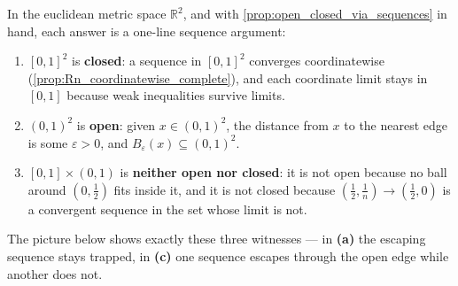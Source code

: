 \begin{example}
\label{ex:open_closed_neither_R2}
In the euclidean metric space $\mathbb{R}^2$, and with
\cref{prop:open_closed_via_sequences} in hand, each answer is a one-line sequence argument:
\begin{enumerate}[label=\textbf{(\alph*)}]
  \item $[0,1]^2$ is \textbf{closed}: a sequence in $[0,1]^2$ converges coordinatewise
    (\cref{prop:Rn_coordinatewise_complete}), and each coordinate limit stays in $[0,1]$ because
    weak inequalities survive limits.
  \item $(0,1)^2$ is \textbf{open}: given $x \in (0,1)^2$, the distance from $x$ to the nearest
    edge is some $\varepsilon>0$, and $B_\varepsilon(x) \subseteq (0,1)^2$.
  \item $[0,1] \times (0,1)$ is \textbf{neither open nor closed}: it is not open because no ball
    around $(0,\tfrac12)$ fits inside it, and it is not closed because
    $(\tfrac12, \tfrac1n) \to (\tfrac12, 0)$ is a convergent sequence in the set whose limit is
    not.
\end{enumerate}
The picture below shows exactly these three witnesses --- in \textbf{(a)} the escaping sequence
stays trapped, in \textbf{(c)} one sequence escapes through the open edge while another does
not.
\end{example}

